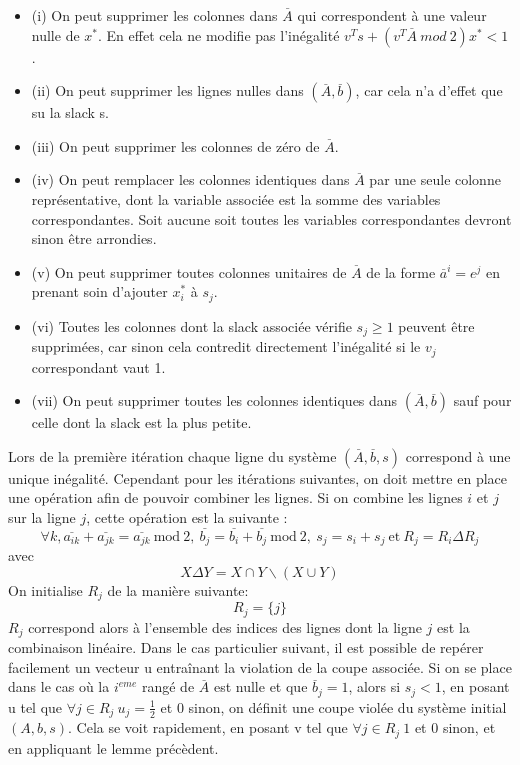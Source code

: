 \documentclass[12pt]{report}
\begin{document}
\begin{itemize}
    \item (i) On peut supprimer les colonnes dans $\overset{\_}{A}$ qui correspondent à une valeur nulle de $x^\ast$. En effet cela ne modifie pas l'inégalité $v^Ts+(v^T\overset{\_}{A}\ mod\ 2)x^\ast < 1 $.
    \item (ii) On peut supprimer les lignes nulles dans $(\overset{\_}{A},\overset{\_}{b})$, car cela n'a d'effet que su la slack s.
    \item (iii) On peut supprimer les colonnes de zéro de $\overset{\_}{A}$.
    \item (iv) On peut remplacer les colonnes identiques dans $\overset{\_}{A}$ par une seule colonne représentative, dont la variable associée est la somme des variables correspondantes. Soit aucune soit toutes les variables correspondantes devront sinon être arrondies.
    \item (v) On peut supprimer toutes colonnes unitaires de $\overset{\_}{A}$ de la forme $\overset{\_}{a}^i=e^j $ en prenant soin d'ajouter $x_i^\ast$ à $s_j$. 
    \item (vi) Toutes les colonnes dont la slack associée vérifie $s_j\ge1$ peuvent être supprimées, car sinon cela contredit directement l'inégalité si le $v_j$ correspondant vaut 1.
    \item (vii) On peut supprimer toutes les colonnes identiques dans $(\overset{\_}{A},\overset{\_}{b})$ sauf pour celle dont la slack est la plus petite.
\end{itemize}
Lors de la première itération chaque ligne du système $(\overset{\_}{A},\overset{\_}{b},s)$ correspond à une unique inégalité. Cependant pour les itérations suivantes, on doit mettre en place une opération afin de pouvoir combiner les lignes.
Si on combine les lignes $i$ et $j$ sur la ligne $j$, cette opération est la suivante :
$$
\forall k, \overset{\_}{a_{ik}}+\overset{\_}{a_{jk}}=\overset{\_}{a_{jk}} \ \mbox{mod} \ 2, \ \overset{\_}{b_{j}}=\overset{\_}{b_{i}}+\overset{\_}{b_{j}} \ \mbox{mod} \ 2, \ s_j=s_i+s_j \ \mbox{et} \ R_j=R_i\Delta R_j
$$
avec
$$
X\Delta Y= X\cap Y \backslash (X \cup Y)
$$
On initialise $R_j$ de la manière suivante:
$$
R_j=\{j\}
$$
$R_j$ correspond alors à l'ensemble des indices des lignes dont la ligne $j$ est la combinaison linéaire.
\newline
Dans le cas particulier suivant, il est possible de repérer facilement un vecteur u entraînant la violation de la coupe associée. Si on se place dans le cas où la $i^{eme}$ rangé de $\overset{\_}{A}$ est nulle et que $\overset{\_}{b}_j = 1$, alors si $s_j<1$, en posant u tel que $\forall j \in R_j \ u_j=\frac{1}{2} $ et 0 sinon, on définit une coupe violée du système initial $(A,b,s)$. Cela se voit rapidement, en posant v tel que $\forall j \in R_j \ 1  $ et 0 sinon, et en appliquant le lemme précèdent. 
\end{document}
